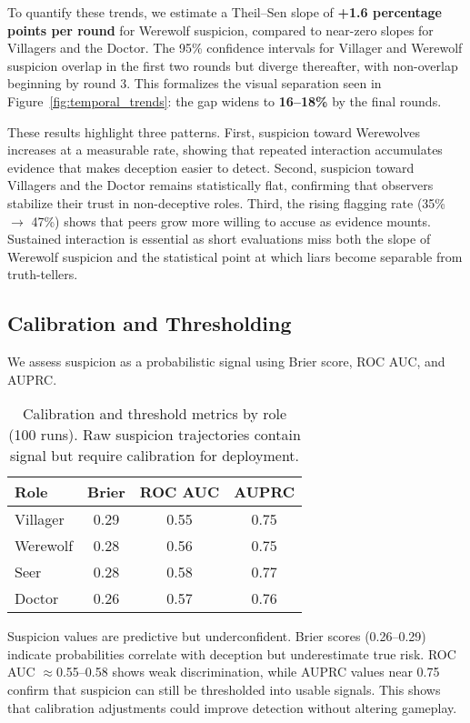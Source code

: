 \documentclass{article}
\begin{document}
To quantify these trends, we estimate a Theil--Sen slope of \textbf{+1.6 percentage points per round} for Werewolf suspicion, compared to near-zero slopes for Villagers and the Doctor. The 95\% confidence intervals for Villager and Werewolf suspicion overlap in the first two rounds but diverge thereafter, with non-overlap beginning by round 3. This formalizes the visual separation seen in Figure~\ref{fig:temporal_trends}: the gap widens to \textbf{16--18\%} by the final rounds.  

These results highlight three patterns. First, suspicion toward Werewolves increases at a measurable rate, showing that repeated interaction accumulates evidence that makes deception easier to detect. Second, suspicion toward Villagers and the Doctor remains statistically flat, confirming that observers stabilize their trust in non-deceptive roles. Third, the rising flagging rate (35\% $\to$ 47\%) shows that peers grow more willing to accuse as evidence mounts. Sustained interaction is essential as short evaluations miss both the slope of Werewolf suspicion and the statistical point at which liars become separable from truth-tellers.
 

\subsection{Calibration and Thresholding}
We assess suspicion as a probabilistic signal using Brier score, ROC AUC, and AUPRC.

\begin{table}[h]
\centering
\caption{Calibration and threshold metrics by role (100 runs). Raw suspicion trajectories contain signal but require calibration for deployment.}
\label{tab:calibration}
\begin{tabular}{lccc}
\toprule
\textbf{Role} & \textbf{Brier} & \textbf{ROC AUC} & \textbf{AUPRC} \\
\midrule
Villager & 0.29 & 0.55 & 0.75 \\
Werewolf & 0.28 & 0.56 & 0.75 \\
Seer     & 0.28 & 0.58 & 0.77 \\
Doctor   & 0.26 & 0.57 & 0.76 \\
\bottomrule
\end{tabular}
\end{table}

Suspicion values are predictive but underconfident. Brier scores (0.26--0.29) indicate probabilities correlate with deception but underestimate true risk. ROC AUC $\approx$0.55--0.58 shows weak discrimination, while AUPRC values near 0.75 confirm that suspicion can still be thresholded into usable signals. This shows that calibration adjustments could improve detection without altering gameplay.
\end{document}

